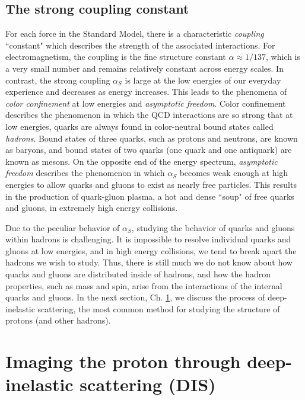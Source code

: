 \subsection{The strong coupling constant}

For each force in the Standard Model, there is a characteristic {\it coupling} ``constant" which describes the strength of the associated interactions. For electromagnetism, the coupling is the fine structure constant $\alpha\approx 1/137$, which is a very small number and remains relatively constant across energy scales. In contrast, the strong coupling $\alpha_S$ is large at the low energies of our everyday experience and decreases as energy increases. This leads to the phenomena of {\it color confinement} at low energies and  {\it asymptotic freedom}. Color confinement describes the phenomenon in which the QCD interactions are so strong that at low energies, quarks are always found in color-neutral bound states called {\it hadrons}. Bound states of three quarks, such as protons and neutrons, are known as baryons, and bound states of two quarks (one quark and one antiquark) are known as mesons. On the opposite end of the energy spectrum, {\it asymptotic freedom} describes the phenomenon in which $\alpha_S$ becomes weak enough at high energies to allow quarks and gluons to exist as nearly free particles. This results in the production of quark-gluon plasma, a hot and dense ``soup" of free quarks and gluons, in extremely high energy collisions.

Due to the peculiar behavior of $\alpha_S$, studying the behavior of quarks and gluons within hadrons is challenging. It is impossible to resolve individual quarks and gluons at low energies, and in high energy collisions, we tend to break apart the hadrons we wish to study. Thus, there is still much we do not know about how quarks and gluons are distributed inside of hadrons, and how the hadron properties, such as mass and spin, arise from the interactions of the internal quarks and gluons. In the next section, Ch. \ref{sec.bkg_DIS}, we discuss the process of deep-inelastic scattering, the most common method for studying the structure of protons (and other hadrons).

\section{Imaging the proton through deep-inelastic scattering (DIS)}
\label{sec.bkg_DIS}

